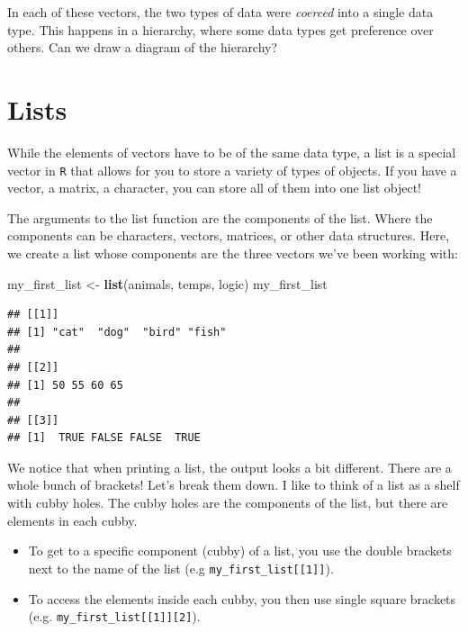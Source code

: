\documentclass[]{article}
\newenvironment{Shaded}{\begin{snugshade}}{\end{snugshade}}
\newcommand{\KeywordTok}[1]{\textcolor[rgb]{0.13,0.29,0.53}{\textbf{#1}}}
\newcommand{\StringTok}[1]{\textcolor[rgb]{0.31,0.60,0.02}{#1}}
\newcommand{\NormalTok}[1]{#1}
\providecommand{\tightlist}{%
  \setlength{\itemsep}{0pt}\setlength{\parskip}{0pt}}
\begin{document}
\vspace{0.25cm}

In each of these vectors, the two types of data were \emph{coerced} into
a single data type. This happens in a hierarchy, where some data types
get preference over others. Can we draw a diagram of the hierarchy?

\section{Lists}\label{lists}

While the elements of vectors have to be of the same data type, a list
is a special vector in \texttt{R} that allows for you to store a variety
of types of objects. If you have a vector, a matrix, a character, you
can store all of them into one list object!

The arguments to the list function are the components of the list. Where
the components can be characters, vectors, matrices, or other data
structures. Here, we create a list whose components are the three
vectors we've been working with:

\vspace{0.25cm}

\begin{Shaded}
\begin{Highlighting}[]
\NormalTok{my_first_list <-}\StringTok{ }\KeywordTok{list}\NormalTok{(animals, temps, logic)}
\NormalTok{my_first_list}
\end{Highlighting}
\end{Shaded}

\begin{verbatim}
## [[1]]
## [1] "cat"  "dog"  "bird" "fish"
## 
## [[2]]
## [1] 50 55 60 65
## 
## [[3]]
## [1]  TRUE FALSE FALSE  TRUE
\end{verbatim}

\vspace{0.25cm}

We notice that when printing a list, the output looks a bit different.
There are a whole bunch of brackets! Let's break them down. I like to
think of a list as a shelf with cubby holes. The cubby holes are the
components of the list, but there are elements in each cubby.

\begin{itemize}
\tightlist
\item
  To get to a specific component (cubby) of a list, you use the double
  brackets next to the name of the list (e.g
  \texttt{my\_first\_list{[}{[}1{]}{]}}).\\
\item
  To access the elements inside each cubby, you then use single square
  brackets (e.g. \texttt{my\_first\_list{[}{[}1{]}{]}{[}2{]}}).
\end{itemize}
\end{document}

